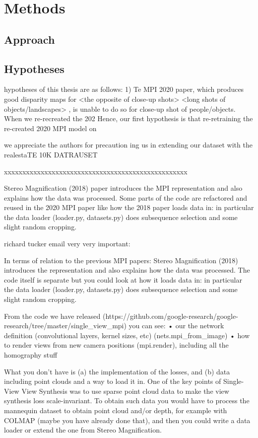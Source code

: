\chapter{Methods}\label{ch2:methods}

\section{Approach}\label{sec1:approach} 

\section{Hypotheses}

 hypotheses of this thesis are as follows:
1) Te MPI 2020 paper, which produces good disparity maps for <the opposite of close-up shots> <long shots of objects/landscapes> \cite{}, is unable to do so for close-up shot of people/objects. When we re-recreated the 202 Hence, our first hypothesis is that re-retraining the re-created 2020 MPI model on  

we appreciate the authors for precaution ing us in extending our dataset with the realestaTE 10K DATRAUSET


xxxxxxxxxxxxxxxxxxxxxxxxxxxxxxxxxxxxxxxxxxxxxxxxxx

Stereo Magnification (2018) paper introduces the MPI representation and also explains how the data was processed. Some parts of the code are refactored and reused in the 2020 MPI paper like how the 2018 paper loads data in: in particular the data loader (loader.py, datasets.py) does subsequence selection and some slight random cropping.

richard tucker email very very important:

In terms of relation to the previous MPI papers: Stereo Magnification (2018) introduces the representation and also explains how the data was processed. The code itself is separate but you could look at how it loads data in: in particular the data loader (loader.py, datasets.py) does subsequence selection and some slight random cropping.

From the code we have released (https://github.com/google-research/google-research/tree/master/single_view_mpi) you can see:
  • our the network definition (convolutional layers, kernel sizes, etc) (nets.mpi_from_image)
  • how to render views from new camera positions (mpi.render), including all the homography stuff

What you don't have is (a) the implementation of the losses, and (b) data including point clouds and a way to load it in.
One of the key points of Single-View View Synthesis was to use sparse point cloud data to make the view synthesis loss scale-invariant. To obtain such data you would have to process the mannequin dataset to obtain point cloud and/or depth, for example with COLMAP (maybe you have already done that), and then you could write a data loader or extend the one from Stereo Magnification.

